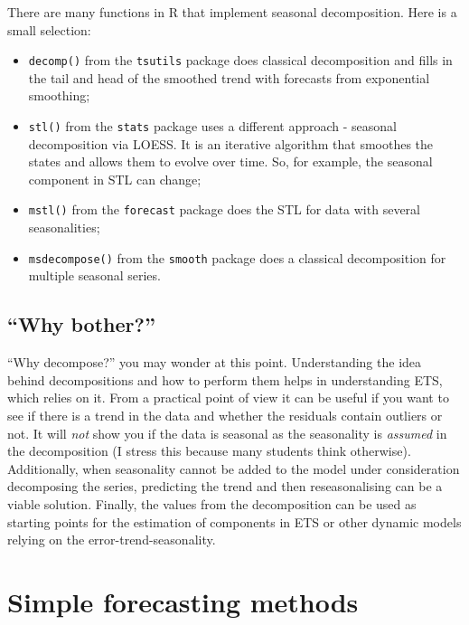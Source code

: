 \documentclass[
]{book}
\providecommand{\tightlist}{%
  \setlength{\itemsep}{0pt}\setlength{\parskip}{0pt}}
\theoremstyle{definition}
\theoremstyle{definition}
\theoremstyle{definition}
\theoremstyle{definition}
\theoremstyle{remark}
\begin{document}
There are many functions in R that implement seasonal decomposition. Here is a small selection:

\begin{itemize}
\tightlist
\item
  \texttt{decomp()} from the \texttt{tsutils} package does classical decomposition and fills in the tail and head of the smoothed trend with forecasts from exponential smoothing;
\item
  \texttt{stl()} from the \texttt{stats} package uses a different approach - seasonal decomposition via LOESS. It is an iterative algorithm that smoothes the states and allows them to evolve over time. So, for example, the seasonal component in STL can change;
\item
  \texttt{mstl()} from the \texttt{forecast} package does the STL for data with several seasonalities;
\item
  \texttt{msdecompose()} from the \texttt{smooth} package does a classical decomposition for multiple seasonal series.
\end{itemize}

\hypertarget{why-bother}{%
\subsection{``Why bother?''}\label{why-bother}}

``Why decompose?'' you may wonder at this point. Understanding the idea behind decompositions and how to perform them helps in understanding ETS, which relies on it. From a practical point of view it can be useful if you want to see if there is a trend in the data and whether the residuals contain outliers or not. It will \emph{not} show you if the data is seasonal as the seasonality is \emph{assumed} in the decomposition (I stress this because many students think otherwise). Additionally, when seasonality cannot be added to the model under consideration decomposing the series, predicting the trend and then reseasonalising can be a viable solution. Finally, the values from the decomposition can be used as starting points for the estimation of components in ETS or other dynamic models relying on the error-trend-seasonality.

\hypertarget{simpleForecastingMethods}{%
\section{Simple forecasting methods}\label{simpleForecastingMethods}}
\end{document}
